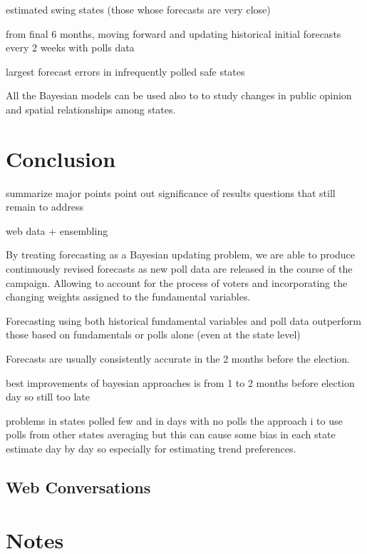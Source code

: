 \documentclass[
  12pt]{article}
\begin{document}
estimated swing states (those whose forecasts are very close)

from final 6 months, moving forward and updating historical initial
forecasts every 2 weeks with polls data

largest forecast errors in infrequently polled safe states

All the Bayesian models can be used also to to study changes in public
opinion and spatial relationships among states.

\hypertarget{sec-conc}{%
\section{Conclusion}\label{sec-conc}}

summarize major points point out significance of results questions that
still remain to address

web data + ensembling

By treating forecasting as a Bayesian updating problem, we are able to
produce continuously revised forecasts as new poll data are released in
the course of the campaign. Allowing to account for the process of
voters and incorporating the changing weights assigned to the
fundamental variables.

Forecasting using both historical fundamental variables and poll data
outperform those based on fundamentals or polls alone (even at the state
level)

Forecasts are usually consistently accurate in the 2 months before the
election.

best improvements of bayesian approaches is from 1 to 2 months before
election day so still too late

problems in states polled few and in days with no polls the approach i
to use polls from other states averaging but this can cause some bias in
each state estimate day by day so especially for estimating trend
preferences.

\hypertarget{web-conversations}{%
\subsection{Web Conversations}\label{web-conversations}}

\hypertarget{notes}{%
\section{Notes}\label{notes}}

\citep{abr:2008} \citep{gel:kin:1993} \citep{cam:1996}
\citep{bro:cha:1999} \citep{rig:2009} \citep{loc:gel:2010}
\citep{lin:2013} \citep{riz:2023}
\end{document}
